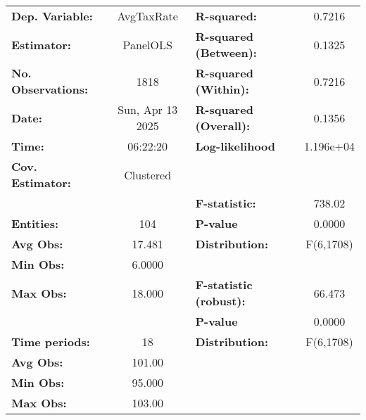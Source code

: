\begin{center}
\begin{tabular}{lclc}
\toprule
\textbf{Dep. Variable:}              &     AvgTaxRate     & \textbf{  R-squared:         }   &      0.7216      \\
\textbf{Estimator:}                  &      PanelOLS      & \textbf{  R-squared (Between):}  &      0.1325      \\
\textbf{No. Observations:}           &        1818        & \textbf{  R-squared (Within):}   &      0.7216      \\
\textbf{Date:}                       &  Sun, Apr 13 2025  & \textbf{  R-squared (Overall):}  &      0.1356      \\
\textbf{Time:}                       &      06:22:20      & \textbf{  Log-likelihood     }   &    1.196e+04     \\
\textbf{Cov. Estimator:}             &     Clustered      & \textbf{                     }   &                  \\
\textbf{}                            &                    & \textbf{  F-statistic:       }   &      738.02      \\
\textbf{Entities:}                   &        104         & \textbf{  P-value            }   &      0.0000      \\
\textbf{Avg Obs:}                    &       17.481       & \textbf{  Distribution:      }   &    F(6,1708)     \\
\textbf{Min Obs:}                    &       6.0000       & \textbf{                     }   &                  \\
\textbf{Max Obs:}                    &       18.000       & \textbf{  F-statistic (robust):} &      66.473      \\
\textbf{}                            &                    & \textbf{  P-value            }   &      0.0000      \\
\textbf{Time periods:}               &         18         & \textbf{  Distribution:      }   &    F(6,1708)     \\
\textbf{Avg Obs:}                    &       101.00       & \textbf{                     }   &                  \\
\textbf{Min Obs:}                    &       95.000       & \textbf{                     }   &                  \\
\textbf{Max Obs:}                    &       103.00       & \textbf{                     }   &                  \\

\end{tabular}
\end{center}
